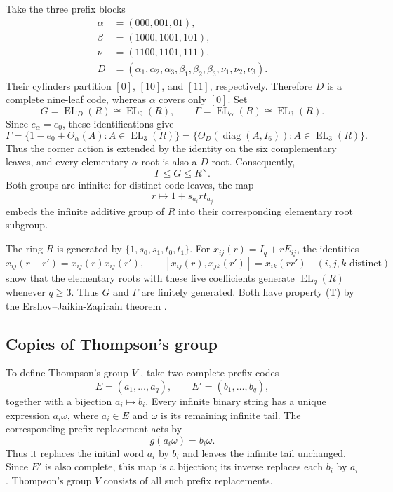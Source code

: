 \documentclass[10pt]{article}
\newcommand{\EL}{\operatorname{EL}}
\newcommand{\diag}{\operatorname{diag}}
\begin{document}
Take the three prefix blocks
\begin{equation}
\begin{aligned}
\alpha&=(000,001,01),\\
\beta&=(1000,1001,101),\\
\nu&=(1100,1101,111),\\
D&=(\alpha_1,\alpha_2,\alpha_3,\beta_1,\beta_2,\beta_3,\nu_1,\nu_2,\nu_3).
\end{aligned}
\tag{14}
\end{equation}
Their cylinders partition $[0]$, $[10]$, and $[11]$, respectively. Therefore $D$ is a complete nine-leaf code, whereas $\alpha$ covers only $[0]$. Set
\[
G=\EL_D(R)\cong\EL_9(R),\qquad \Gamma=\EL_\alpha(R)\cong\EL_3(R).
\]
Since $e_\alpha=e_0$, these identifications give
\[
\Gamma=\{1-e_0+\Theta_\alpha(A):A\in\EL_3(R)\}
=\{\Theta_D(\diag(A,I_6)):A\in\EL_3(R)\}.
\]
Thus the corner action is extended by the identity on the six complementary leaves, and every elementary $\alpha$-root is also a $D$-root. Consequently,
\[
\Gamma\leq G\leq R^\times.
\]
Both groups are infinite: for distinct code leaves, the map
\[
r\longmapsto1+s_{a_i}rt_{a_j}
\]
embeds the infinite additive group of $R$ into their corresponding elementary root subgroup.

The ring $R$ is generated by $\{1,s_0,s_1,t_0,t_1\}$. For $x_{ij}(r)=I_q+rE_{ij}$, the identities
\[
x_{ij}(r+r')=x_{ij}(r)x_{ij}(r'),\qquad
[x_{ij}(r),x_{jk}(r')]=x_{ik}(rr')\quad(i,j,k\text{ distinct})
\]
show that the elementary roots with these five coefficients generate $\EL_q(R)$ whenever $q\geq3$. Thus $G$ and $\Gamma$ are finitely generated. Both have property (T) by the Ershov--Jaikin-Zapirain theorem \cite[Theorem~1.1]{EJ10}.

\subsection{Copies of Thompson's group}
To define Thompson's group $V$ \cite{CFP96}, take two complete prefix codes
\[
E=(a_1,\ldots,a_q),\qquad E'=(b_1,\ldots,b_q),
\]
together with a bijection $a_i\mapsto b_i$. Every infinite binary string has a unique expression $a_i\omega$, where $a_i\in E$ and $\omega$ is its remaining infinite tail. The corresponding prefix replacement acts by
\[
g(a_i\omega)=b_i\omega.
\]
Thus it replaces the initial word $a_i$ by $b_i$ and leaves the infinite tail unchanged. Since $E'$ is also complete, this map is a bijection; its inverse replaces each $b_i$ by $a_i$. Thompson's group $V$ consists of all such prefix replacements.
\end{document}

